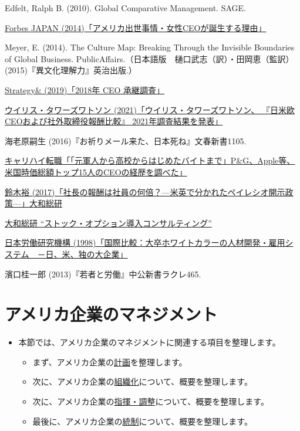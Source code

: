 \documentclass[
]{book}
\begin{document}
Edfelt, Ralph B. (2010). Global Comparative Management. SAGE.

\href{https://forbesjapan.com/articles/detail/990}{Forbes JAPAN (2014)「アメリカ出世事情・女性CEOが誕生する理由」}

Meyer, E. (2014). The Culture Map: Breaking Through the Invisible Boundaries of Global Business. PublicAffairs.（日本語版　樋口武志（訳）・田岡恵（監訳）(2015)『異文化理解力』英治出版.）

\href{https://www.strategyand.pwc.com/jp/ja/publications/2018_ceo-data-media-release-jp.pdf}{Strategy\& (2019)「2018年 CEO 承継調査」}

\href{https://www.willistowerswatson.com/ja-JP/News/2021/07/report-fy2020-comparison-of-compensation-for-ceos-and-ned-between-japan-the-united-states-and-europe}{ウイリス・タワーズワトソン (2021)「ウイリス・タワーズワトソン、 『日米欧CEOおよび社外取締役報酬比較』 2021年調査結果を発表」}

海老原嗣生 (2016)『お祈りメール来た、日本死ね』文春新書1105.

\href{https://www.recme.jp/careerhigh/entry/usaceo}{キャリハイ転職「「元軍人から高校からはじめたバイトまで」P\&G、Apple等、米国時価総額トップ15人のCEOの経歴を調べた」}

\href{https://www.dir.co.jp/report/column/20170921_012304.html}{鈴木裕 (2017)「社長の報酬は社員の何倍？---米英で分かれたペイレシオ開示政策---」大和総研}

\href{https://www.dir.co.jp/business/consulting/compensation/stock-option.html}{大和総研 ``ストック・オプション導入コンサルティング''}

\href{https://warp.da.ndl.go.jp/info:ndljp/pid/11486206/db.jil.go.jp/db/seika/zenbun/E2000014381_ZEN.htm}{日本労働研究機構 (1998)「国際比較：大卒ホワイトカラーの人材開発・雇用システム　－日、米、独の大企業」}

濱口桂一郎 (2013)『若者と労働』中公新書ラクレ465.

\hypertarget{us-management}{%
\section{アメリカ企業のマネジメント}\label{us-management}}

\begin{itemize}
\item
  本節では、アメリカ企業のマネジメントに関連する項目を整理します。

  \begin{itemize}
  \item
    まず、アメリカ企業の\protect\hyperlink{us-plan}{計画}を整理します。
  \item
    次に、アメリカ企業の\protect\hyperlink{us-organization}{組織化}について、概要を整理します。
  \item
    次に、アメリカ企業の\protect\hyperlink{us-command}{指揮・調整}について、概要を整理します。
  \item
    最後に、アメリカ企業の\protect\hyperlink{us-control}{統制}について、概要を整理します。
  \end{itemize}
\end{itemize}
\end{document}
